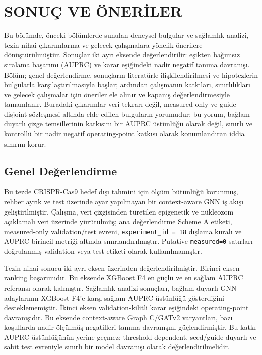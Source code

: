 \chapter{SONUÇ VE ÖNERİLER}
\label{chap:sonuc}

Bu bölümde, önceki bölümlerde sunulan deneysel bulgular ve sağlamlık analizi, tezin nihai çıkarımlarına ve gelecek çalışmalara yönelik önerilere dönüştürülmüştür. Sonuçlar iki ayrı eksende değerlendirilir: eşikten bağımsız sıralama başarımı (AUPRC) ve karar eşiğindeki nadir negatif tanıma davranışı. Bölüm; genel değerlendirme, sonuçların literatürle ilişkilendirilmesi ve hipotezlerin bulgularla karşılaştırılmasıyla başlar; ardından çalışmanın katkıları, sınırlılıkları ve gelecek çalışmalar için öneriler ele alınır ve kapanış değerlendirmesiyle tamamlanır. Buradaki çıkarımlar veri tekrarı değil, measured-only ve guide-disjoint sözleşmesi altında elde edilen bulguların yorumudur; bu yorum, bağlam duyarlı çizge temsillerinin katkısını bir AUPRC üstünlüğü olarak değil, sınırlı ve kontrollü bir nadir negatif operating-point katkısı olarak konumlandıran iddia sınırını korur.

\section{Genel Değerlendirme}

Bu tezde CRISPR-Cas9 hedef dışı tahmini için ölçüm bütünlüğü korunmuş, rehber ayrık ve test üzerinde ayar yapılmayan bir context-aware GNN iş akışı geliştirilmiştir. Çalışma,  veri çizgisinden türetilen epigenetik ve nükleozom açıklamalı veri üzerinde yürütülmüş; ana değerlendirme Scheme A etiketi, measured-only validation/test evreni, \texttt{experiment\_id = 18} dışlama kuralı ve AUPRC birincil metriği altında sınırlandırılmıştır. Putative \texttt{measured=0} satırları doğrulanmış validation veya test etiketi olarak kullanılmamıştır.

Tezin nihai sonucu iki ayrı eksen üzerinden değerlendirilmiştir. Birinci eksen ranking başarımıdır. Bu eksende XGBoost F4 en güçlü ve en sağlam AUPRC referansı olarak kalmıştır. Sağlamlık analizi sonuçları, bağlam duyarlı GNN adaylarının XGBoost F4'e karşı sağlam AUPRC üstünlüğü gösterdiğini desteklememiştir. İkinci eksen validation-kilitli karar eşiğindeki operating-point davranışıdır. Bu eksende context-aware Graph C/GATv2 varyantları, bazı koşullarda nadir ölçülmüş negatifleri tanıma davranışını güçlendirmiştir. Bu katkı AUPRC üstünlüğünün yerine geçmez; threshold-dependent, seed/guide duyarlı ve sabit test evreniyle sınırlı bir model davranışı olarak değerlendirilmelidir.

